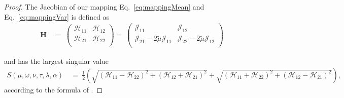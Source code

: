 \documentclass{article}
\newcommand\munn{{\tilde \mu}}
\begin{document}
\begin{proof}

The Jacobian of our mapping  Eq.~\eqref{eq:mappingMean} and 
Eq.~\eqref{eq:mappingVar} is defined as
\begin{align}
\bm H \ &= \ \left(
\begin{array}{cc}
{\mathcal H}_{11} & {\mathcal H}_{12} \\
 {\mathcal H}_{21} & {\mathcal H}_{22} \\
\end{array}
\right) =
\ \left(
\begin{array}{cc}
{\mathcal J}_{11} & {\mathcal J}_{12} \\
 {\mathcal J}_{21} - 2 \munn {\mathcal J}_{11} & {\mathcal J}_{22} - 2 \munn {\mathcal J}_{12} \\
\end{array}
\right)
\end{align}

and has the largest singular value
\begin{align}
S(\mu,\omega,\nu,\tau,\lambda ,\alpha ) \ &= \ 
\frac{1}{2}
\left(\sqrt{({\mathcal H}_{11}-{\mathcal H}_{22})^2+({\mathcal H}_{12}+{\mathcal H}_{21})^2}+
\sqrt{({\mathcal H}_{11}+{\mathcal H}_{22})^2+({\mathcal H}_{12}-{\mathcal H}_{21})^2}\right),
\end{align}
according to the formula of \citet{Blinn:96}.


\end{proof}
\end{document}
